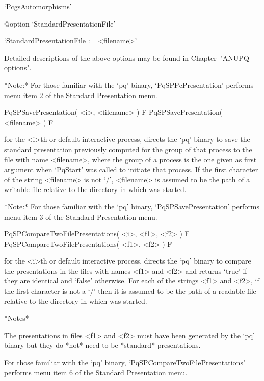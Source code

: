 \item{}`PcgsAutomorphisms'

%
{@option \noexpand`StandardPresentationFile'}
\item{}`StandardPresentationFile := <filename>'

\endlist

Detailed descriptions of the above options may be found in Chapter~"ANUPQ
options".

*Note:* For those familiar with  the  `pq'  binary,  `PqSPPcPresentation'
performs menu item 2 of the Standard Presentation menu.

\>PqSPSavePresentation( <i>, <filename> ) F
\>PqSPSavePresentation( <filename> ) F

for the <i>th or default interactive {\ANUPQ} process, directs  the  `pq'
binary to save the standard  presentation  previously  computed  for  the
group of that process to the file with name <filename>, where  the  group
of a process is the one given as first argument when `PqStart' was called
to initiate that process. If the first character of the string <filename>
is not `/', <filename> is assumed to be  the  path  of  a  writable  file
relative to the directory in which {\GAP} was started.

*Note:* For those familiar with the `pq'  binary,  `PqSPSavePresentation'
performs menu item 3 of the Standard Presentation menu.

\>PqSPCompareTwoFilePresentations( <i>, <f1>, <f2> ) F
\>PqSPCompareTwoFilePresentations( <f1>, <f2> ) F

for the <i>th or default interactive {\ANUPQ} process, directs  the  `pq'
binary to compare the presentations in the files with names <f1> and <f2>
and returns `true' if they are identical and `false' otherwise. For  each
of the strings <f1> and <f2>, if the first character is not a `/' then it
is assumed to be the path of a readable file relative to the directory in
which {\GAP} was started.

*Notes*

The presentations in files <f1> and <f2> must have been generated by  the
`pq' binary but they do *not* need to be *standard* presentations.

For      those      familiar      with       the       `pq'       binary,
`PqSPCompareTwoFilePresentations' performs menu item 6  of  the  Standard
Presentation menu.

